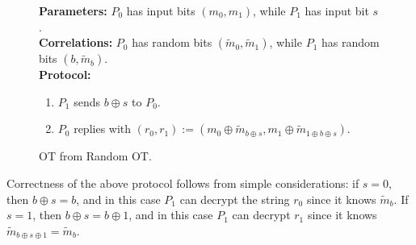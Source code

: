 \begin{figure}[h]
	\begin{mdframed}[
		linecolor=black,
		linewidth=1pt,
		roundcorner=5pt,
		backgroundcolor=white,
		userdefinedwidth=\textwidth,
		]
		\vspace{2mm}
		\textbf{Parameters:} $P_0$ has input bits $(m_0, m_1)$, while $P_1$ has input bit $s$.\\
		\textbf{Correlations:} $P_0$ has random bits $(\tilde{m}_0,\tilde{m}_1)$, while $P_1$ has random bits $(b, \tilde{m}_b)$.\\
		
		\textbf{Protocol:}
		\begin{enumerate}
			\item $P_1$ sends $b\oplus s$ to $P_0$.
			\item $P_0$ replies with $(r_0, r_1):=(m_{0}\oplus\tilde{m}_{b\oplus s}, m_{1}\oplus\tilde{m}_{1\oplus b\oplus s}).$
		\end{enumerate}
		\vspace{2mm}
	\end{mdframed}
	\caption{OT from Random OT.}
	\label{fig:rot}
\end{figure}

Correctness of the above protocol follows from simple considerations: if $s=0$, then $b\oplus s = b$, and in this case $P_1$ can decrypt the string $r_0$ since it knows $\tilde{m}_b$. If $s=1$, then $b\oplus s = b\oplus 1$, and in this case $P_1$ can decrypt $r_1$ since it knows $\tilde{m}_{b\oplus s\oplus 1}=\tilde{m}_b$.